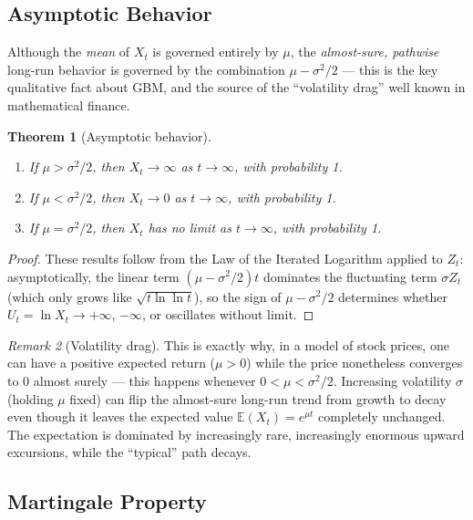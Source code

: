 \documentclass[12pt,openany]{book}
\newtheorem{theorem}{Theorem}[section]
\theoremstyle{definition}
\theoremstyle{remark}
\newtheorem{remark}[theorem]{Remark}
\newcommand{\E}{\mathbb{E}}
\begin{document}
\subsection{Asymptotic Behavior}
 
Although the \emph{mean} of $X_t$ is governed entirely by $\mu$, the \emph{almost-sure, pathwise} long-run behavior is governed by the combination $\mu-\sigma^2/2$ — this is the key qualitative fact about GBM, and the source of the ``volatility drag'' well known in mathematical finance.
 
\begin{theorem}[Asymptotic behavior]
\begin{enumerate}[label=(\arabic*)]
    \item If $\mu > \sigma^2/2$, then $X_t \to \infty$ as $t\to\infty$, with probability 1.
    \item If $\mu < \sigma^2/2$, then $X_t \to 0$ as $t\to\infty$, with probability 1.
    \item If $\mu = \sigma^2/2$, then $X_t$ has no limit as $t\to\infty$, with probability 1.
\end{enumerate}
\end{theorem}
\begin{proof}
These results follow from the Law of the Iterated Logarithm applied to $Z_t$: asymptotically, the linear term $(\mu-\sigma^2/2)t$ dominates the fluctuating term $\sigma Z_t$ (which only grows like $\sqrt{t\ln\ln t}$), so the sign of $\mu-\sigma^2/2$ determines whether $U_t=\ln X_t \to +\infty$, $-\infty$, or oscillates without limit.
\end{proof}
 
\begin{remark}[Volatility drag]
This is exactly why, in a model of stock prices, one can have a positive expected return ($\mu>0$) while the price nonetheless converges to $0$ almost surely — this happens whenever $0<\mu<\sigma^2/2$. Increasing volatility $\sigma$ (holding $\mu$ fixed) can flip the almost-sure long-run trend from growth to decay even though it leaves the expected value $\E(X_t)=e^{\mu t}$ completely unchanged. The expectation is dominated by increasingly rare, increasingly enormous upward excursions, while the ``typical'' path decays.
\end{remark}
 
\subsection{Martingale Property}
 
\end{document}
